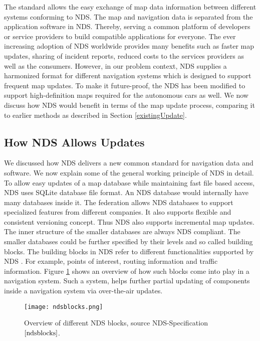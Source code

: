 The standard allows the easy exchange of map data information between different systems conforming to NDS. The map and navigation data is separated from the application software in NDS. Thereby, serving a common platform of developers or service providers to build compatible applications for everyone. The ever increasing adoption of NDS worldwide provides many benefits such as faster map updates, sharing of incident reports, reduced costs to the services providers as well as the consumers. However, in our problem context, NDS supplies a harmonized format for different navigation systems which is designed to support frequent map updates. To make it future-proof, the NDS has been modified to support high-definition maps required for the autonomous cars as well. We now discuss how NDS would benefit in terms of the map update process, comparing it to earlier methods as described in Section \ref{existingUpdate}. 

\subsection{How NDS Allows Updates}
We discussed how NDS delivers a new common standard for navigation data and software. We now explain some of the general working principle of NDS in detail. To allow easy updates of a map database while maintaining fast file based access, NDS uses SQLite database file format. An NDS database would internally have many databases inside it. The federation allows NDS databases to support specialized features from different companies. It also supports flexible and consistent versioning concept. Thus NDS also supports incremental map updates. The inner structure of the smaller databases are always NDS compliant. The smaller databases could be further specified by their levels and so called building blocks. The building blocks in NDS refer to different functionalities supported by NDS \cite{ndsblocks}. For example, points of interest, routing information and traffic information. Figure \ref{fg:ndsblocks} shows an overview of how such blocks come into play in a navigation system. Such a system, helps further partial updating of components inside a navigation system via over-the-air updates.  \\
\begin{figure}
\centering
\texttt{[image: ndsblocks.png]}
\label{fg:ndsblocks}
\caption{Overview of different NDS blocks, source NDS-Specification$\cite{ndsblocks}$.}
\end{figure}


